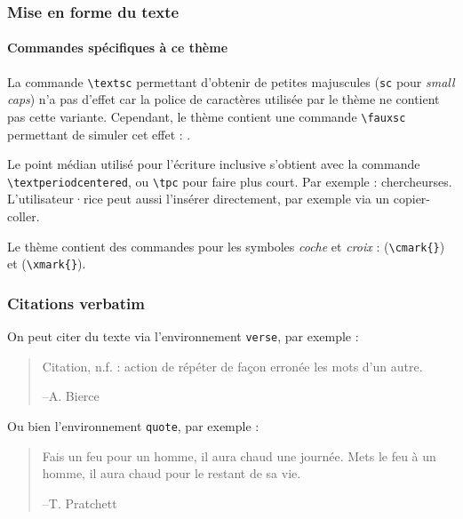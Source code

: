 \documentclass[10pt,    %
    french,             %
    xcolor=table,       %
    envcountsect,       %
    aspectratio=43      %
]{beamer}
\begin{document}
\begin{frame}
    \frametitle{Mise en forme du texte}
    \framesubtitle{Commandes spécifiques à ce thème}
    
    La commande \texttt{\textbackslash{}textsc} permettant d'obtenir de petites majuscules (\texttt{sc} pour \textit{small caps}) n'a pas d'effet car la police de caractères utilisée par le thème ne contient pas cette variante. Cependant, le thème contient une commande \texttt{\textbackslash{}fauxsc} permettant de simuler cet effet : .
    
    \medskip
    Le point médian utilisé pour l'écriture inclusive s'obtient avec la commande \texttt{\textbackslash{}textperiodcentered}, ou \texttt{\textbackslash{}tpc} pour faire plus court. Par exemple : chercheur\textperiodcentered{}se\tpc{}s. L'utilisateur·rice peut aussi l'insérer directement, par exemple via un copier-coller.

    \medskip
    Le thème contient des commandes pour les symboles \textit{coche} et \textit{croix} : \cmark{} (\texttt{\textbackslash{}cmark\{\}}) et \xmark{} (\texttt{\textbackslash{}xmark\{\}}).
\end{frame}
    
\begin{frame}
    \frametitle{Citations verbatim}
    
    On peut citer du texte via l'environnement \texttt{verse}, par exemple :
    \begin{verse}
        Citation, n.f. : action de répéter de façon erronée les mots d’un autre. \\ 
        \vspace{-0.5cm}
        \begin{flushright}--A. Bierce\end{flushright}
    \end{verse}
    
    Ou bien l'environnement \texttt{quote}, par exemple :
    \begin{quote}
        Fais un feu pour un homme, il aura chaud une journée. Mets le feu à un homme, il aura chaud pour le restant de sa vie. \\ 
        \begin{flushright}--T. Pratchett\end{flushright}
    \end{quote}
\end{frame}
    
\end{document}
